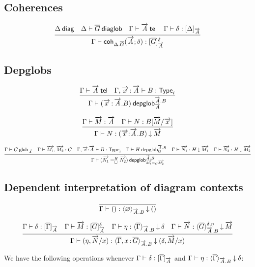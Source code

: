 \subsection{Coherences}

\begin{small}
  \[
  \infer{\ofglob{\Gamma}{\coh{{\Delta}.\diag{G}}{\tel A}{\delta}}
    {\interpglob{\diag{G}}{\tel A}{\delta}}}
  {\wfdiag{\Delta}
    & \wfdiaglob{\Delta}{\diag G}
    & \wftel{\Gamma}{\tel A}
    & \ofinterp{\Gamma}{\delta}{\Delta}{\tel A}}
  \]
\end{small}

\subsection{Depglobs}

\begin{small}
\[
\infer
  {\wfdepglob{\Gamma}{(\teltm xA.B)}{\tel{A}.B}{\tel{A}}}
  {\wftel{\Gamma}{\tel A}
  &\wftype{\Gamma,\teltm xA}{B}}
\]

\[
\infer
  {\ofdepglob{\Gamma}{N}{(\tel{x}{:}\tel{A}.B)}{\tel{M}}}
  {\ofglob{\Gamma}{\tel{M}}{\tel{A}}
  &\ofglob{\Gamma}{N}{B[\tel{M}/\tel{x}]}}
\]

  \[\infer{\wfdepglob{\Gamma}{(\dhomj{H}{\tel{N_1}}{\tel{N_2}}{\blank})}
    {\tel{A}.B}{\homj{G}{\tel{M_1}}{\tel{M_2}}}}
  {\wfglob{\Gamma}{G}{\tel{A}}
    & \ofglob{\Gamma}{\tel{M_1},\tel{M_2}}{G}
    & \wftype{\Gamma,\tel{x}{:}\tel{A}}{B}
    & \wfdepglob{\Gamma}{H}{\tel{A}.B}{G}
    & \ofdepglob{\Gamma}{\tel{N_1}}{H}{\tel{M_1}}
    & \ofdepglob{\Gamma}{\tel{N_2}}{H}{\tel{M_2}}}\]
\end{small}

\subsection{Dependent interpretation of diagram contexts}

\[\infer
  {\ofinterpdep{\Gamma}{()}{\emptyctx}{\tel A.B}{()}}
  {}
\]

\[
\infer
  {\ofinterpdep{\Gamma}{(\eta,\tel N/x)}
   {\diag\Gamma,\tptm{x}{\diag G}}{\tel A.B}{(\delta,\tel M/x)}}
  {\ofinterp{\Gamma}{\delta}{\diag\Gamma}{\tel A}
  &\ofglob{\Gamma}{\tel M}{\interpglob{\diag G}{\tel A}{\delta}}
  &\ofinterpdep{\Gamma}{\eta}{\diag\Gamma}{\tel A.B}{\delta}
  &\ofdepglob{\Gamma}{\tel N}{\interpdepglob{\diag G}{\tel A.B}{\delta}{\eta}}
   {\tel M}}
\]

We have the following operations whenever
${\Gamma} \vdash {\delta} : {[ \overline{\Gamma} ]_{\overrightarrow{A}}}$ and
${\Gamma} \vdash {\eta} : {\langle \overline{\Gamma} \rangle_{\overrightarrow{A}.B}}\mathbin{\downarrow}{\delta}$:

